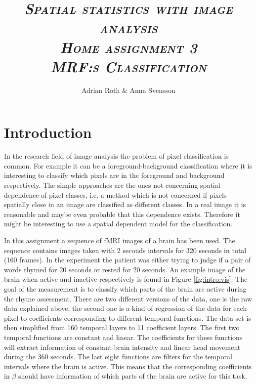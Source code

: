 \documentclass[a4paper,english]{article}
\begin{document}
\afterpage{\cfoot{\thepage}}

\title{\textit{{\textbf{\textsc{Spatial statistics with image analysis  \\ Home assignment 3 \\  MRF:s Classification}}}}}

\author{Adrian Roth \& Anna Svensson}

\maketitle
\thispagestyle{empty}



\pagebreak{}

\thispagestyle{empty}

\pagebreak{}

\section{Introduction}
In the research field of image analysis the problem of pixel classification is common.
For example it can be a foreground-background classification where it is interesting to classify which pixels are in the foreground and background respectively.
The simple approaches are the ones not concerning spatial dependence of pixel classes, i.e. a method which is not concerned if pixels spatially close in an image are classified as different classes.
In a real image it is reasonable and maybe even probable that this dependence exists.
Therefore it might be interesting to use a spatial dependent model for the classification.

In this assignment a sequence of fMRI images of a brain has been used.
The sequence contains images taken with 2 seconds intervals for 320 seconds in total (160 frames).
In the experiment the patient was either trying to judge if a pair of words rhymed for 20 seconds or rested for 20 seconds.
An example image of the brain when active and inactive respectively is found in Figure \ref{fig:intro:vis}.
The goal of the measurement is to classify which parts of the brain are active during the rhyme assessment.
There are two different versions of the data, one is the raw data explained above, the second one is a kind of regression of the data for each pixel to coefficients corresponding to different temporal functions.
The data set is then simplified from 160 temporal layers to 11 coefficient layers.
The first two temporal functions are constant and linear.
The coefficients for these functions will extract information of constant brain intensity and linear head movement during the 360 seconds.
The last eight functions are filters for the temporal intervals where the brain is active.
This means that the corresponding coefficients in $\beta$ should have information of which parts of the brain are active for this task.
\end{document}
